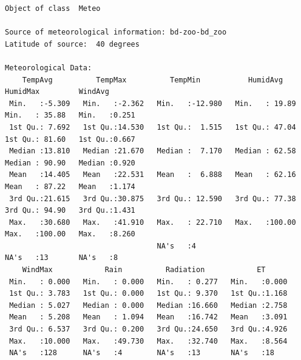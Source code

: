 \begin{verbatim}
Object of class  Meteo 

Source of meteorological information: bd-zoo-bd_zoo 
Latitude of source:  40 degrees

Meteorological Data:
    TempAvg          TempMax          TempMin           HumidAvg         HumidMax         WindAvg     
 Min.   :-5.309   Min.   :-2.362   Min.   :-12.980   Min.   : 19.89   Min.   : 35.88   Min.   :0.251  
 1st Qu.: 7.692   1st Qu.:14.530   1st Qu.:  1.515   1st Qu.: 47.04   1st Qu.: 81.60   1st Qu.:0.667  
 Median :13.810   Median :21.670   Median :  7.170   Median : 62.58   Median : 90.90   Median :0.920  
 Mean   :14.405   Mean   :22.531   Mean   :  6.888   Mean   : 62.16   Mean   : 87.22   Mean   :1.174  
 3rd Qu.:21.615   3rd Qu.:30.875   3rd Qu.: 12.590   3rd Qu.: 77.38   3rd Qu.: 94.90   3rd Qu.:1.431  
 Max.   :30.680   Max.   :41.910   Max.   : 22.710   Max.   :100.00   Max.   :100.00   Max.   :8.260  
                                   NA's   :4                          NA's   :13       NA's   :8      
    WindMax            Rain          Radiation            ET       
 Min.   : 0.000   Min.   : 0.000   Min.   : 0.277   Min.   :0.000  
 1st Qu.: 3.783   1st Qu.: 0.000   1st Qu.: 9.370   1st Qu.:1.168  
 Median : 5.027   Median : 0.000   Median :16.660   Median :2.758  
 Mean   : 5.208   Mean   : 1.094   Mean   :16.742   Mean   :3.091  
 3rd Qu.: 6.537   3rd Qu.: 0.200   3rd Qu.:24.650   3rd Qu.:4.926  
 Max.   :10.000   Max.   :49.730   Max.   :32.740   Max.   :8.564  
 NA's   :128      NA's   :4        NA's   :13       NA's   :18
\end{verbatim}

